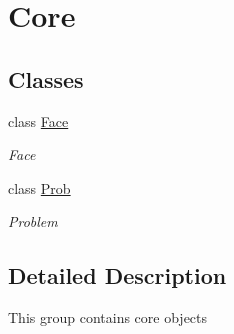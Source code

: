 \hypertarget{group__group__core}{\section{Core}
\label{group__group__core}
}
\subsection*{Classes}
\begin{DoxyCompactItemize}
\item 
class \hyperlink{classFace}{Face}
\begin{DoxyCompactList}\small\item\em Face \end{DoxyCompactList}\item 
class \hyperlink{classProb}{Prob}
\begin{DoxyCompactList}\small\item\em Problem \end{DoxyCompactList}\end{DoxyCompactItemize}


\subsection{Detailed Description}
This group contains core objects 